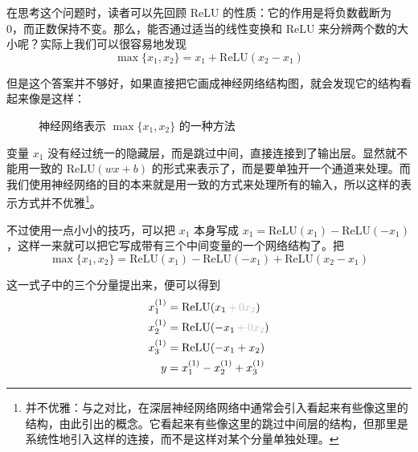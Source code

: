 在思考这个问题时，读者可以先回顾 ReLU 的性质：它的作用是将负数截断为 0，而正数保持不变。那么，能否通过适当的线性变换和 ReLU 来分辨两个数的大小呢？实际上我们可以很容易地发现
\[
    \max\{x_1, x_2\} = x_1 + \text{ReLU}(x_2 - x_1) 
\]

但是这个答案并不够好，如果直接把它画成神经网络结构图，就会发现它的结构看起来像是这样：
\begin{figure}[H]
\centering
{}
\caption{神经网络表示 $\max\{x_1, x_2\}$ 的一种方法}
\end{figure}

变量 $x_1$ 没有经过统一的隐藏层，而是跳过中间，直接连接到了输出层。显然就不能用一致的 $\text{ReLU}(wx+b)$ 的形式来表示了，而是要单独开一个通道来处理。而我们使用神经网络的目的本来就是用一致的方式来处理所有的输入，所以这样的表示方式并不优雅\footnote{并不优雅：与之对比，在深层神经网络网络中通常会引入看起来有些像这里的结构，由此引出的概念。它看起来有些像这里的跳过中间层的结构，但那里是系统性地引入这样的连接，而不是这样对某个分量单独处理。}。

不过使用一点小小的技巧，可以把 $x_1$ 本身写成 $x_1 = \text{ReLU}(x_1) - \text{ReLU}(-x_1)$，这样一来就可以把它写成带有三个中间变量的一个网络结构了。把
\[
    \max\{x_1, x_2\} = \text{ReLU}(x_1) - \text{ReLU}(-x_1) + \text{ReLU}(x_2 - x_1)
\]

这一式子中的三个分量提出来，便可以得到
\[
\begin{aligned}
    x_1^{(1)} &= \text{ReLU}(x_1\,{\color{lightgray}+\,0x_2}) \\
    x_2^{(1)} &= \text{ReLU}(-x_1\,{\color{lightgray}+\,0x_2}) \\
    x_3^{(1)} &= \text{ReLU}(- x_1 + x_2) \\
    y &= x_1^{(1)} - x_2^{(1)} + x_3^{(1)} 
\end{aligned}
\]

